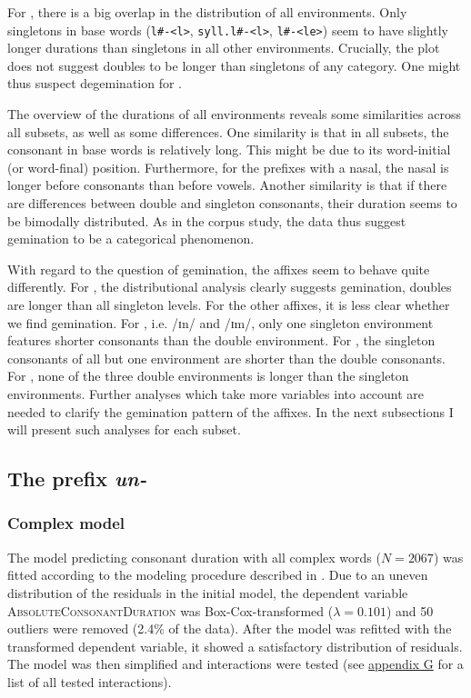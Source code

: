 
For , there is a big overlap in the distribution of all environments. Only singletons in base words (\texttt{l\#-<l>}, \texttt{syll.l\#-<l>}, \texttt{l\#-<le>}) seem to have slightly longer durations than singletons in all other environments. Crucially, the plot does not suggest doubles to be longer than singletons of any category. One might thus suspect degemination for . 

The overview of the durations of all environments reveals some similarities across all subsets, as well as some differences. 
One similarity is that in all subsets, the consonant in base words is relatively long. This might be due to its word-initial (or word-final) position. 
Furthermore, for the prefixes with a nasal, the nasal is longer before consonants than before vowels. 
Another similarity is that if there are differences between double and singleton consonants, their duration seems to be bimodally distributed. As in the corpus study, the data thus suggest gemination to be a categorical phenomenon.

With regard to the question of gemination, the affixes seem to behave quite differently. For , the distributional analysis clearly suggests gemination, doubles are longer than all singleton levels. 
For the other affixes, it is less clear whether we find gemination. For , i.e. /ɪn/ and /ɪm/, only one singleton environment features shorter consonants than the double environment.
For , the singleton consonants of all but one environment are shorter than the double consonants. 
For , none of the three double environments is longer than the singleton environments. Further analyses which take more variables into account are needed to clarify the gemination pattern of the affixes. 
 In the next subsections I will present such analyses for each subset.


\subsection{The prefix \textit{un-}} \label{un experiment}

\subsubsection{Complex model}


The model predicting consonant duration with all complex words ($N=2067$) was fitted according to the modeling procedure described in . Due to an uneven distribution of the residuals in the initial model, the dependent variable \textsc{AbsoluteConsonantDuration} was Box-Cox-transformed ($\lambda = 0.101$) and 50 outliers were removed (2.4\% of the data).
 After the model was refitted with the transformed dependent variable, it showed a satisfactory distribution of residuals.  The model was then simplified and interactions were tested (see \hyperref[Appendix G Summaries of tested interactions in experimental study]{appendix G} for a list of all tested interactions).
 
